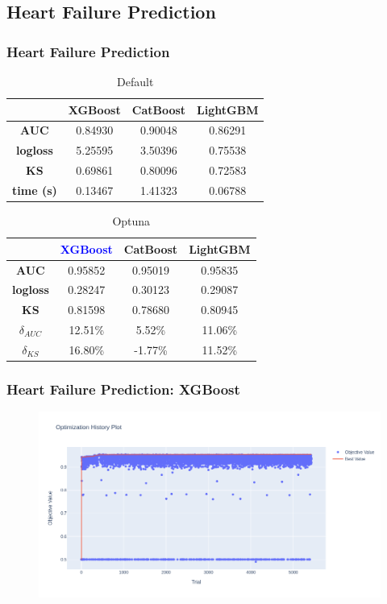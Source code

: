 \documentclass{beamer}
\begin{document}
\subsection{Heart Failure Prediction}
\begin{frame}
\frametitle{Heart Failure Prediction}
\begin{table}[H]
\centering
\begin{tabular}{|c|c|c|c|}
\hline
	& \textbf{XGBoost} &\textbf{CatBoost} & \textbf{LightGBM} \\
\hline
\textbf{AUC}	& 0.84930&	0.90048&	0.86291\\
\hline
\textbf{logloss}	& 5.25595&	3.50396	&0.75538\\
\hline
\textbf{KS}	&0.69861	&0.80096	&0.72583\\
\hline
\textbf{time (s)}	& 0.13467	&1.41323	&0.06788 \\
\hline
\end{tabular}
\caption{Default}\label{res:dia:1}
\end{table}
\begin{table}[H]
\centering
\begin{tabular}{|c|c|c|c|}
\hline
	& \textcolor{blue}{\textbf{XGBoost}} &\textbf{CatBoost} & \textbf{LightGBM} \\
\hline
\hline
\textbf{AUC}	& 0.95852	&0.95019	&0.95835\\
\hline
\textbf{logloss}	& 0.28247	&0.30123	&0.29087\\
\hline
\textbf{KS}	&0.81598	&0.78680 &0.80945\\
\hline
$\delta_{AUC}$	& 12.51\%&	5.52\%	   &     11.06\% \\
\hline
$\delta_{KS}$	&    16.80\% 	&  -1.77\% &	11.52\%\\
\hline
\end{tabular}
\caption{Optuna}\label{res:dia:op}
\end{table}
\end{frame}
\begin{frame}
\frametitle{Heart Failure Prediction: XGBoost}
\begin{figure}[H]

 \label{fig:op:dia:lamb:lgbm}
 \centering
 \includegraphics[scale=0.3]{optuna_xgboost_heart.png}
\end{figure}
\end{frame}
\end{document}
